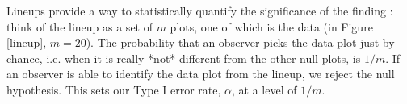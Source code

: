 


Lineups provide a way to statistically quantify the significance of the finding \cite{majumder:2011}: think of the lineup as a set of $m$ plots, one of which is the data (in Figure \ref{lineup}, $m=20$).  The probability that an observer picks the data plot just by chance, i.e. when it is really *not* different from the other null plots, is $1/m$.  If an observer is able to identify the data plot from the lineup, we reject the null hypothesis.  This sets our Type I error rate, $\alpha$, at a level of $1/m$.

